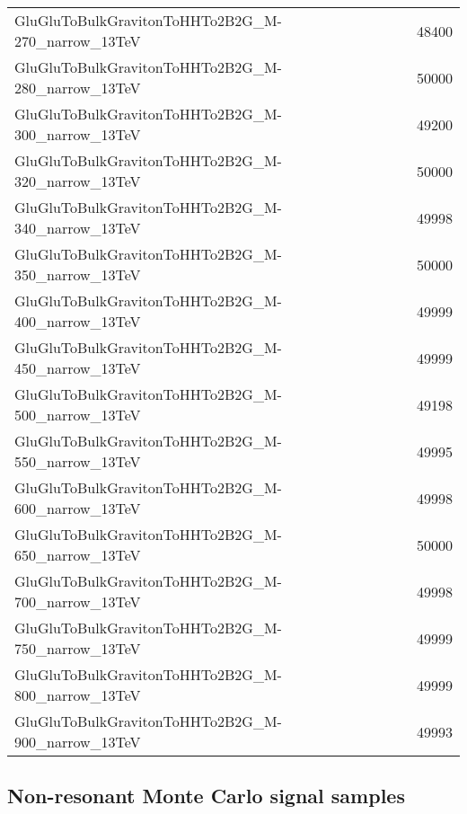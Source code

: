 \begin{table}[h]
\begin{tabular}{ll}
GluGluToBulkGravitonToHHTo2B2G\_M-270\_narrow\_13TeV & 48400           \\
GluGluToBulkGravitonToHHTo2B2G\_M-280\_narrow\_13TeV & 50000           \\
GluGluToBulkGravitonToHHTo2B2G\_M-300\_narrow\_13TeV & 49200           \\
GluGluToBulkGravitonToHHTo2B2G\_M-320\_narrow\_13TeV & 50000           \\
GluGluToBulkGravitonToHHTo2B2G\_M-340\_narrow\_13TeV & 49998           \\
GluGluToBulkGravitonToHHTo2B2G\_M-350\_narrow\_13TeV & 50000           \\
GluGluToBulkGravitonToHHTo2B2G\_M-400\_narrow\_13TeV & 49999           \\
GluGluToBulkGravitonToHHTo2B2G\_M-450\_narrow\_13TeV & 49999            \\
GluGluToBulkGravitonToHHTo2B2G\_M-500\_narrow\_13TeV & 49198            \\
GluGluToBulkGravitonToHHTo2B2G\_M-550\_narrow\_13TeV & 49995            \\
GluGluToBulkGravitonToHHTo2B2G\_M-600\_narrow\_13TeV & 49998            \\
GluGluToBulkGravitonToHHTo2B2G\_M-650\_narrow\_13TeV & 50000            \\
GluGluToBulkGravitonToHHTo2B2G\_M-700\_narrow\_13TeV & 49998            \\
GluGluToBulkGravitonToHHTo2B2G\_M-750\_narrow\_13TeV & 49999            \\
GluGluToBulkGravitonToHHTo2B2G\_M-800\_narrow\_13TeV & 49999            \\
GluGluToBulkGravitonToHHTo2B2G\_M-900\_narrow\_13TeV & 49993            \\ \hline
\end{tabular}
\label{tab:HbbggSamples}
\end{table}

\clearpage

\subsection{Non-resonant Monte Carlo signal samples} \label{sec:NonResonantMCsamples}

